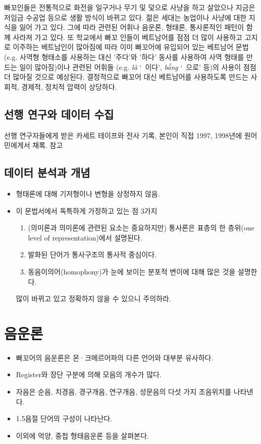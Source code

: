 빠꼬인들은 전통적으로 화전을 일구거나 무기 및 덫으로 사냥을 하고 살았으나 지금은 저임금 수공업 등으로 생활 방식이 바뀌고 있다. 젊은 세대는 농업이나 사냥에 대한 지식을 잃어 가고 있다. 그에 따라 관련된 어휘나 음운론, 형태론, 통사론적인 패턴이 함께 사라져 가고 있다. 또 학교에서 빠꼬 인들이 베트남어를 점점 더 많이 사용하고 고지로 이주하는 베트남인이 많아짐에 따라 이미 빠꼬어에 유입되어 있는 베트남어 문법 (e.g. 사역형 형태소를 사용하는 대신 '주다'와 '하다' 동사를 사용하여 사역 형태를 만드는 일이 많아짐)이나 관련된 어휘들 (e.g. {\itshape{là}} ‘~이다’, {\itshape{bằng}} ‘~으로’ 등)의 사용이 점점 더 많아질 것으로 예상된다. 결정적으로 빠꼬어 대신 베트남어를 사용하도록 만드는 사회적, 경제적, 정치적 압력이 상당하다.

\subsection{선행 연구와 데이터 수집}
선행 연구자들에게 받은 카세트 테이프와 전사 기록, 본인이 직접 1997, 1998년에 원어민에게서 채록.
참고

\subsection{데이터 분석과 개념}
\begin{itemize} 
\item 형태론에 대해 기저형이나 변형을 상정하지 않음.

\item 이 문법서에서 독특하게 가정하고 있는 점 3가지
\begin{enumerate}
\item (의미론과 의미론에 관련된 요소는 중요하지만) 통사론은 표층의 한 층위(one level of representation)에서 설명된다.
\item 발화된 단어가 통사구조의 통사적 중심이다.
\item 동음이의어(homophony)가 눈에 보이는 분포적 변이에 대해 많은 것을 설명한다.
\end{enumerate}

많이 바뀌고 있고 정확하지 않을 수 있으니 주의하라.
\end{itemize}

\section{음운론}
\begin{itemize} 
\item 빠꼬어의 음운론은 몬·크메르어파의 다른 언어와 대부분 유사하다.
\item Register와 장단 구분에 의해 모음의 개수가 많다. 
\item 자음은 순음, 치경음, 경구개음, 연구개음, 성문음의 다섯 가지 조음위치를 나타낸다. 
\item 1.5음절 단어의 구성이 나타난다. 
\item 이외에 억양, 중첩 형태음운론 등을 살펴본다. 
\end{itemize}

